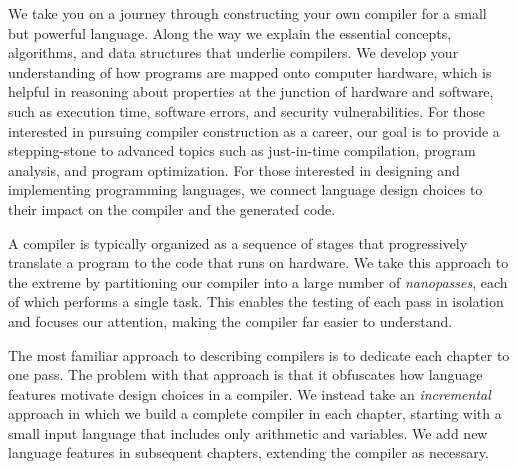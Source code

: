 \documentclass[7x10]{TimesAPriori_MIT}%
\numberwithin{theorem}{chapter}
\numberwithin{definition}{chapter}
\numberwithin{equation}{chapter}
\begin{document}
We take you on a journey through constructing your own compiler for a
small but powerful language. Along the way we explain the essential
concepts, algorithms, and data structures that underlie compilers. We
develop your understanding of how programs are mapped onto computer
hardware, which is helpful in reasoning about properties at the
junction of hardware and software, such as execution time, software
errors, and security vulnerabilities.  For those interested in
pursuing compiler construction as a career, our goal is to provide a
stepping-stone to advanced topics such as just-in-time compilation,
program analysis, and program optimization.  For those interested in
designing and implementing programming languages, we connect language
design choices to their impact on the compiler and the generated code.

A compiler is typically organized as a sequence of stages that
progressively translate a program to the code that runs on
hardware. We take this approach to the extreme by partitioning our
compiler into a large number of \emph{nanopasses}, each of which
performs a single task. This enables the testing of each pass in
isolation and focuses our attention, making the compiler far easier to
understand.

The most familiar approach to describing compilers is to dedicate each
chapter to one pass. The problem with that approach is that it
obfuscates how language features motivate design choices in a
compiler. We instead take an \emph{incremental} approach in which we
build a complete compiler in each chapter, starting with a small input
language that includes only arithmetic and variables. We add new
language features in subsequent chapters, extending the compiler as
necessary.
\end{document}
